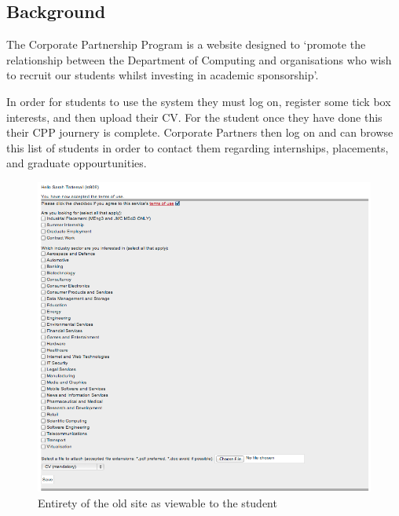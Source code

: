 \subsection{Background}
The Corporate Partnership Program is a website designed to `promote the relationship between the Department of Computing and organisations who wish to recruit our students whilst investing in academic sponsorship'\cite{doc-cpp}.

In order for students to use the system they must log on, register some tick box interests, and then upload their CV.
For the student once they have done this their CPP journery is complete.
Corporate Partners then log on and can browse this list of students in order to contact them regarding internships, placements, and graduate oppourtunities.

\begin{figure}[H]\centering
\includegraphics[scale=0.5]{images/introduction/old_cpp}
\caption{Entirety of the old site as viewable to the student}
\end{figure}
